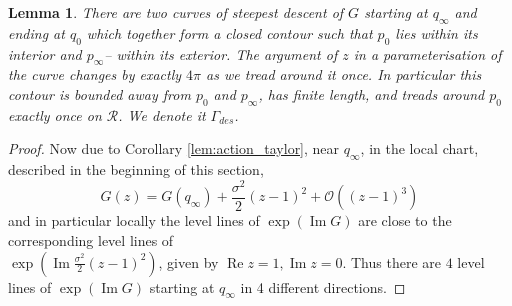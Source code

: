 \documentclass[11pt]{article}
\theoremstyle{plain}
\newtheorem{lemma}[theorem]{Lemma}
\theoremstyle{definition}
\numberwithin{equation}{section}
\DeclareMathOperator{\im}{Im}
\DeclareMathOperator{\re}{Re}
\begin{document}
%
\begin{lemma}%
 \label{lemma:curvesofsteepest}
There are two curves of steepest descent of $G$ starting at $q_{\infty}$ and ending at $q_0$ which together form a closed contour 
such that $p_0$ lies within its interior and $p_{\infty}$-- within its exterior. The argument of $z$ in a parameterisation of the curve changes by exactly $4\pi$ as we tread around it once. In particular this contour is bounded away from $p_0$ and $p_\infty$, has finite length, and treads around $p_0$ exactly once on $\mathcal{R}$. We denote it $\Gamma_{des}$. 
\end{lemma}

\begin{proof}
%
%
%
Now due to Corollary \ref{lem:action_taylor}, near $q_{\infty}$, in the local chart, described in the beginning of this section,
$$G(z)=G(q_{\infty})+\frac{\sigma^2}{2}(z-1)^2+\mathcal{O}((z-1)^3)$$
and in particular locally the level lines of 
%
$\exp(\im G)$ are close to the corresponding level lines of 
%
%
\\ $\exp(\im \frac{\sigma^2}{2}(z-1)^2)$, given by $\re z=1,  \im z=0$. Thus there are $4$ level lines of $\exp(\im G)$ starting at $q_{\infty}$ in 4 different directions.
 \item 
%


\end{proof}
\end{document}
